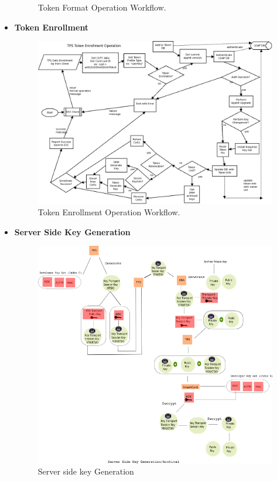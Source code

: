 \documentclass[a4paper]{article}
\begin{document}
\begin{itemize}
\begin{figure}[H]
                \caption{Token Format Operation Workflow. ~\cite{RedHat:securechannel}}
            \end{figure}
        \item \textbf{Token Enrollment}
            \begin{figure}[H]
                \centering
                \includegraphics[width=120mm]{TPS_Enrollment.png}
                \caption{Token Enrollment Operation Workflow.~\cite{RedHat:securechannel}}
            \end{figure}
        \item \textbf{Server Side Key Generation}
            \begin{figure}[H]
                \centering
                \includegraphics[width=120mm]{tks-tps-drm-esc-enrollment3.png}
                \caption{Server side key Generation}
            \end{figure}
    \end{itemize}
\end{document}
